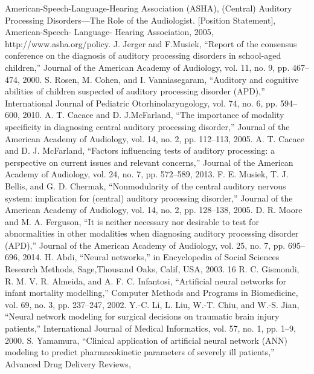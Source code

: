 \documentclass[letterpaper%
, twoside%
, 12pt%
,these%
, english%
,creativecommons,hyperref%
]{thETS}
\begin{document}
\begin{thebibliography}{9}

	 American-Speech-Language-Hearing Association (ASHA), (Central) Auditory Processing
	Disorders—The Role of the Audiologist. [Position Statement], American-Speech-
	Language- Hearing Association, 2005, http://www.asha.org/policy.
	 J. Jerger and F.Musiek, “Report of the consensus conference on the diagnosis of auditory
	processing disorders in school-aged children,” Journal of the American Academy of Audiology,
	vol. 11, no. 9, pp. 467–474, 2000.
 S. Rosen, M. Cohen, and I. Vanniasegaram, “Auditory and cognitive abilities of children suspected of auditory processing disorder (APD),” International Journal of Pediatric
	Otorhinolaryngology, vol. 74, no. 6, pp. 594–600, 2010.
	 A. T. Cacace and D. J.McFarland, “The importance of modality specificity in diagnosing
	central auditory processing disorder,” Journal of the American Academy of Audiology,
	vol. 14, no. 2, pp. 112–113, 2005.
	 A. T. Cacace and D. J. McFarland, “Factors influencing tests of auditory processing: a
	perspective on current issues and relevant concerns,” Journal of the American Academy of
	Audiology, vol. 24, no. 7, pp. 572–589, 2013.
	 F. E. Musiek, T. J. Bellis, and G. D. Chermak, “Nonmodularity of the central auditory
	nervous system: implication for (central) auditory processing disorder,” Journal of the
	American Academy of Audiology, vol. 14, no. 2, pp. 128–138, 2005.
 D. R. Moore and M. A. Ferguson, “It is neither necessary nor desirable to test for abnormalities
	in other modalities when diagnosing auditory processing disorder (APD),” Journal
	of the American Academy of Audiology, vol. 25, no. 7, pp. 695–696, 2014.
 H. Abdi, “Neural networks,” in Encyclopedia of Social Sciences Research Methods,
	Sage,Thousand Oaks, Calif, USA, 2003.
	16
 R. C. Gismondi, R. M. V. R. Almeida, and A. F. C. Infantosi, “Artificial neural networks
	for infant mortality modelling,” Computer Methods and Programs in Biomedicine, vol. 69,
	no. 3, pp. 237–247, 2002.
 Y.-C. Li, L. Liu, W.-T. Chiu, and W.-S. Jian, “Neural network modeling for surgical
	decisions on traumatic brain injury patients,” International Journal of Medical Informatics,
	vol. 57, no. 1, pp. 1–9, 2000.
 S. Yamamura, “Clinical application of artificial neural network (ANN) modeling to predict
	pharmacokinetic parameters of severely ill patients,” Advanced Drug Delivery Reviews,

\end{thebibliography}
\end{document}
